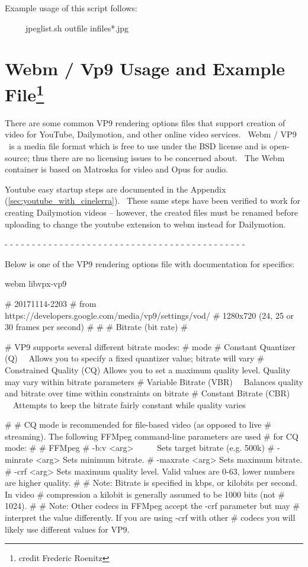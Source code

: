 Example usage of this script follows:
\medskip

\ \ \ \ \ jpeglist.sh outfile infiles*.jpg
\medskip

\section{Webm / Vp9 Usage and Example File\protect\footnote{credit Frederic Roenitz}}
\label{sec:Webm / Vp9 Usage and Example File}

There are some common VP9 rendering options files that support creation of video for YouTube, Dailymotion, and other online video services. \ Webm / VP9 \ is a media file format which is free to use under the BSD license and is open-source; thus there are no licensing issues to be concerned about. \ The Webm container is based on Matroska for video and Opus for audio.
\medskip

Youtube easy startup steps are documented in the Appendix (\ref{sec:youtube_with_cinelerra}). \ These same steps have been verified to work for creating Dailymotion videos -- however, the created files must be renamed before uploading to change the youtube extension to webm instead for Dailymotion.

{}- - - - - - - - - - - - - - - - - - - - - - - - - - - - - - - - - - - - - - - - - - - -
\medskip

Below is one of the VP9 rendering options file with documentation for specifics:
\medskip

webm libvpx-vp9
\medskip

\# 20171114-2203
\# from https://developers.google.com/media/vp9/settings/vod/
\# 1280x720 (24, 25 or 30 frames per second)
\#
\#
\# Bitrate (bit rate)
\#

\# VP9 supports several different bitrate modes:
\# mode 
\# Constant Quantizer (Q) \ \ Allows you to specify a fixed quantizer value; bitrate will vary
\# Constrained Quality (CQ) Allows you to set a maximum quality level. Quality may vary within bitrate parameters
\# Variable Bitrate (VBR) \ \ Balances quality and bitrate over time within constraints on bitrate
\# Constant Bitrate (CBR) \ \ Attempts to keep the bitrate fairly constant while quality varies

\#
\# CQ mode is recommended for file-based video (as opposed to live
\# streaming). The following FFMpeg command-line parameters are used
\# for CQ mode:
\#
\# FFMpeg 
\# -b:v {\textless}arg{\textgreater} \ \ \ \ \ Sets target bitrate (e.g. 500k)
\# -minrate {\textless}arg{\textgreater} Sets minimum bitrate.
\# -maxrate {\textless}arg{\textgreater} Sets maximum bitrate.
\# -crf {\textless}arg{\textgreater} Sets maximum quality level. Valid values are 0-63, lower numbers are higher quality.
\#
\# Note: Bitrate is specified in kbps, or kilobits per second. In video
\# compression a kilobit is generally assumed to be 1000 bits (not
\# 1024).
\#
\# Note: Other codecs in FFMpeg accept the -crf parameter but may
\# interpret the value differently. If you are using -crf with other
\# codecs you will likely use different values for VP9.

